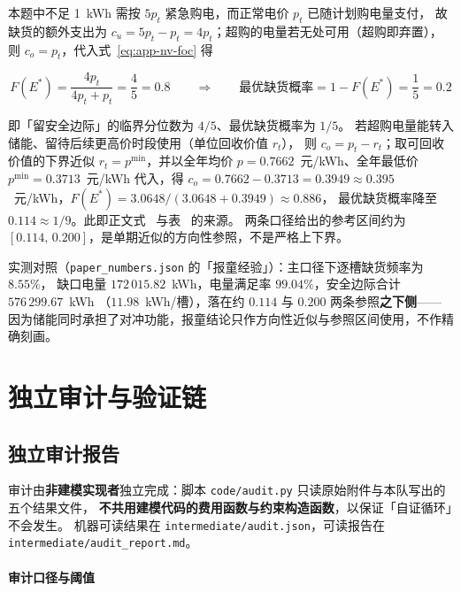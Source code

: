 本题中不足 1~kWh 需按 $5p_t$ 紧急购电，而正常电价 $p_t$ 已随计划购电量支付，
故缺货的额外支出为 $c_u=5p_t-p_t=4p_t$；超购的电量若无处可用（超购即弃置），
则 $c_o=p_t$，代入式~\eqref{eq:app-nv-foc} 得

\begin{equation}
  F(E^{*})=\frac{4p_t}{4p_t+p_t}=\frac45=0.8
  \qquad\Longrightarrow\qquad
  \text{最优缺货概率}=1-F(E^{*})=\frac15=0.2
  \label{eq:app-nv-result}
\end{equation}

即「留安全边际」的临界分位数为 $4/5$、最优缺货概率为 $1/5$。
若超购电量能转入储能、留待后续更高价时段使用（单位回收价值 $r_t$），
则 $c_o=p_t-r_t$；取可回收价值的下界近似 $r_t=p^{\min}$，并以全年均价
$p=0.7662$~元/kWh、全年最低价 $p^{\min}=0.3713$~元/kWh 代入，得
$c_o=0.7662-0.3713=0.3949\approx0.395$~元/kWh，$F(E^{*})=3.0648/(3.0648+0.3949)\approx0.886$，
最优缺货概率降至 $0.114\approx1/9$。此即正文式~ 与表~ 的来源。
两条口径给出的参考区间约为 $[0.114,\,0.200]$，是单期近似的方向性参照，不是严格上下界。

实测对照（\texttt{paper\_numbers.json} 的「报童经验」）：主口径下逐槽缺货频率为 $8.55\%$，
缺口电量 $172\,015.82$~kWh，电量满足率 $99.04\%$，安全边际合计 $576\,299.67$~kWh
（$11.98$~kWh/槽），落在约 $0.114$ 与 $0.200$ 两条参照\textbf{之下侧}——
因为储能同时承担了对冲功能，报童结论只作方向性近似与参照区间使用，不作精确刻画。

\section{独立审计与验证链}

\subsection{独立审计报告}

审计由\textbf{非建模实现者}独立完成：脚本 \texttt{code/audit.py} 只读原始附件与本队写出的五个结果文件，
\textbf{不共用建模代码的费用函数与约束构造函数}，以保证「自证循环」不会发生。
机器可读结果在 \texttt{intermediate/audit.json}，可读报告在 \texttt{intermediate/audit\_report.md}。

\paragraph{审计口径与阈值}

